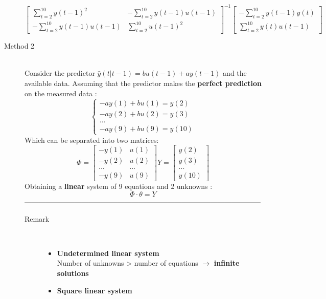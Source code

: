 \begin{description}
$$			\begin{bmatrix}
		\sum\limits_{t=2}^{10}y(t-1)^2 & -\sum\limits_{t=2}^{10}y(t-1)u(t-1) \\
		-\sum\limits_{t=2}^{10}y(t-1)u(t-1) & \sum\limits_{t=2}^{10}u(t-1)^2	
			\end{bmatrix}^{-1}
			\begin{bmatrix}
			-\sum\limits_{t=2}^{10}y(t-1)y(t) \\
			\sum\limits_{t=2}^{10}y(t)u(t-1)
\end{bmatrix}					             
             $$ 
\item[Method 2]\hfill\\
Consider the predictor $\hat{y}(t|t-1)= bu(t-1)+ay(t-1) $ and the available data.
Assuming that the predictor makes the \textbf{perfect prediction} on the measured data :
\[ 
\begin{cases}
 -ay(1)+bu(1)=y(2) \\
 -ay(2)+bu(2)=y(3) \\
 ...\\
 -ay(9)+bu(9)=y(10)
\end{cases}
\]
Which can be separated into two matrices:
$$ 	\Phi = \begin{bmatrix}
          	  -y(1) & u(1) \\
              -y(2) & u(2) \\
              ...   & ...  \\
              -y(9) & u(9) 
             \end{bmatrix}
            Y= \begin{bmatrix}
             y(2)\\
             y(3) \\
             ... \\
             y(10)
             \end{bmatrix}$$
Obtaining a \textbf{linear} system of 9 equations and 2 unknowns :
\[
\boxed{\Phi \cdot \theta = Y} 
\]\newpage
---------------------------------------------------------------------------------------------------
\begin{description}
\item[Remark]\hfill\\
\begin{itemize}
\item \textbf{Undetermined linear system}\\
Number of unknowns > number of equations $\to$ \textbf{infinite solutions}
\item \textbf{Square linear system}\\

\end{itemize}
\end{description}
\end{description}
